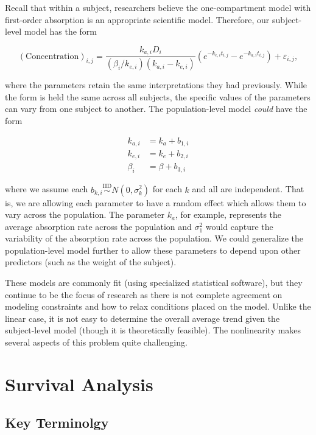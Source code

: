 \documentclass[
]{book}
\theoremstyle{plain}
\theoremstyle{mydefn}
\theoremstyle{myexmpl}
\theoremstyle{remark}
\begin{document}
Recall that within a subject, researchers believe the one-compartment model with first-order absorption is an appropriate scientific model. Therefore, our subject-level model has the form

\[(\text{Concentration})_{i,j} = \frac{k_{a,i} D_i}{\left(\beta_i/k_{e,i}\right)\left(k_{a,i} - k_{e,i}\right)} \left(e^{-k_{e,i} t_{i,j}} - e^{-k_{a,i} t_{i,j}}\right) + \varepsilon_{i,j},\]

where the parameters retain the same interpretations they had previously. While the form is held the same across all subjects, the specific values of the parameters can vary from one subject to another. The population-level model \emph{could} have the form

\[
\begin{aligned}
  k_{a,i} &= k_{a} + b_{1,i} \\
  k_{e,i} &= k_{e} + b_{2,i} \\
  \beta_i &= \beta + b_{3,i}
\end{aligned}
\]

where we assume each \(b_{k,i} \stackrel{\text{IID}}{\sim}N\left(0, \sigma^2_k\right)\) for each \(k\) and all are independent. That is, we are allowing each parameter to have a random effect which allows them to vary across the population. The parameter \(k_a\), for example, represents the average absorption rate across the population and \(\sigma_1^2\) would capture the variability of the absorption rate across the population. We could generalize the population-level model further to allow these parameters to depend upon other predictors (such as the weight of the subject).

These models are commonly fit (using specialized statistical software), but they continue to be the focus of research as there is not complete agreement on modeling constraints and how to relax conditions placed on the model. Unlike the linear case, it is not easy to determine the overall average trend given the subject-level model (though it is theoretically feasible). The nonlinearity makes several aspects of this problem quite challenging.

\hypertarget{part-survival-analysis}{%
\part{Survival Analysis}\label{part-survival-analysis}}

\hypertarget{surv-terminology}{%
\chapter{Key Terminolgy}\label{surv-terminology}}
\end{document}
